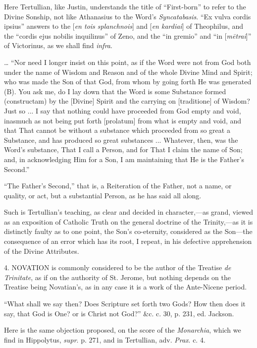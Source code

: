 Here Tertullian, like Justin, understands the title of
``First-born'' to refer to the Divine Sonship, not like
Athanasius to the Word's \emph{Syncatabasis}. ``Ex vulva cordis
ipsius'' answers to the [\emph{en tois splanchnois}] and [\emph{en
kardiai}] of Theophilus, and the ``cordis ejus nobilis
inquilinus'' of Zeno, and the ``in gremio'' and ``in [\emph{m\={e}trai}]''
of Victorinus, as we shall find \emph{infra}.

… ``Nor need I longer insist on this point, as if the Word
were not from God both under the name of Wisdom and Reason and of the
whole Divine Mind and Spirit; who was made the Son of that God, from
whom by going forth He was generated (B). You ask me, do I lay down
that the Word is some Substance formed (constructam) by the
[Divine] Spirit and the carrying on [traditione] of Wisdom? Just so
... I say that nothing could have proceeded from God empty and void,
inasmuch as not being put forth [prolatum] from what is empty and
void, and that That cannot be without a substance which proceeded from
so great a Substance, and has produced so great substances ...
Whatever, then, was the Word's substance, That I call a Person, and
for That I claim the name of Son; and, in acknowledging Him for a Son,
I am maintaining that He is the Father's Second.''

``The Father's Second,'' that is, a Reiteration of the
Father, not a name, or quality, or act, but a substantial Person, as
he has said all along.

Such is Tertullian's teaching, as clear and decided in character,—as
grand, viewed as an exposition of Catholic Truth on the general
doctrine of the Trinity,—as it is distinctly faulty as to one point,
the Son's co-eternity, considered as the Son—the consequence of an
error which has its root, I repeat, in his defective apprehension of
the Divine Attributes.

4. NOVATION is commonly considered to be the
author of the Treatise \emph{de Trinitate}, as if on the authority of
St. Jerome, but nothing depends on the Treatise being Novatian's, as
in any case it is a work of the Ante-Nicene period.

``What shall we say then? Does Scripture set forth two Gods?
How then does it say, that God is One? or is Christ not God?''
\&c. c. 30, p. 231, ed. Jackson.

Here is the same objection proposed, on the score of the \emph{Monarchia},
which we find in Hippolytus, \emph{supr}. p. 271, and in Tertullian,
adv. \emph{Prax}.
c. 4.

